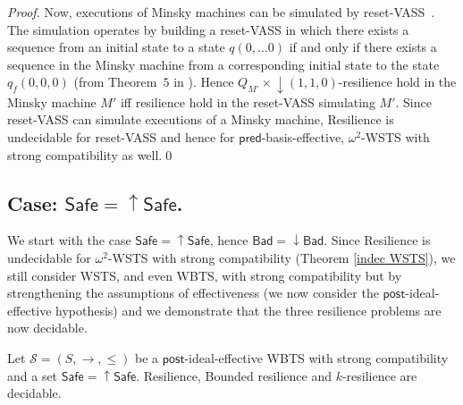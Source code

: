 \documentclass[runningheads]{llncs}
\newcommand{\alain}[1]{\todo[inline,color=red!20]{{\bf AF:} #1}}
\newcommand{\pred}{\textsf{pred}}
\newcommand{\post}{\textsf{post}}
\newcommand{\Bad}{\textsf{Bad}}
\newcommand{\Safe}{\textsf{Safe}}
\begin{document}
\begin{proof}
\alain{écrire qqchose ici}
Now, executions of Minsky machines can be simulated by reset-VASS~\cite{araki1976PN,dufourd1998reset}. 
The simulation operates by building a reset-VASS in which
there exists
 a sequence from 
an initial state %
to
a state $ q(0,  \ldots 0)$ if and only if
there exists
a sequence
 in the Minsky machine
 from a corresponding initial state
 to
 the state $q_f(0,0,0)$
  (from Theorem~$5$ in \cite{araki1976PN}).
Hence $Q_{M'} \times \mathop{\downarrow} (1,1,0)$-resilience hold in the Minsky machine $M'$ iff 
resilience hold in the reset-VASS simulating $M'$.
Since reset-VASS can simulate executions of a Minsky machine, {\sc Resilience} is undecidable for reset-VASS and hence for  $\pred$-basis-effective, 
$\omega^2$-WSTS with strong compatibility as well.\qed
\fi
\end{proof}


\subsection{Case: $\Safe=\mathop{\uparrow} \Safe$.}\label{safe-up}

We start with the case $\Safe=\mathop{\uparrow} \Safe$, hence $\Bad=\mathop{\downarrow} \Bad$.
Since Resilience is undecidable for  $\omega^2$-WSTS with strong compatibility (Theorem \ref{indec WSTS}), we still consider WSTS, and even WBTS, with strong compatibility but by strengthening the assumptions of effectiveness (we now consider the $\post$-ideal-effective hypothesis) and we demonstrate that the three resilience problems are now decidable.




%
\begin{theorem}\label{down-up}
Let $\mathscr{S}=(S,\rightarrow, \leq)$ be a $\post$-ideal-effective WBTS with strong compatibility and a set $\Safe = \mathop{\uparrow} \Safe$.
{\sc Resilience}, {\sc Bounded resilience} 
and {\sc $k$-resilience} are decidable.
\end{theorem}

\end{document}

